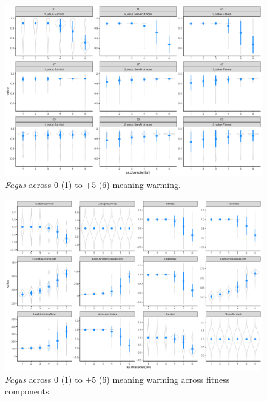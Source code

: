 \documentclass[11pt,letter]{article}
\begin{document}
\begin{figure} 
 \begin{center}
\noindent \includegraphics[width=1\textwidth]{..//analyses/graphs/phenofit/sims/metrics3/meansim_3metricsFS.pdf}
  \caption{\emph{Fagus} across 0 (1) to $+$5 (6) meaning warming.}
  \label{fig:fagusmean3}
  \end{center}
\end{figure}

\begin{figure} 
 \begin{center}
\noindent \includegraphics[width=1\textwidth]{..//analyses/graphs/phenofit/sims/meansim41_allmetricsFS.pdf}
  \caption{\emph{Fagus} across 0 (1) to $+$5 (6) meaning warming across fitness components.}
  \label{fig:fagusmean41}
  \end{center}
\end{figure}
\end{document}
